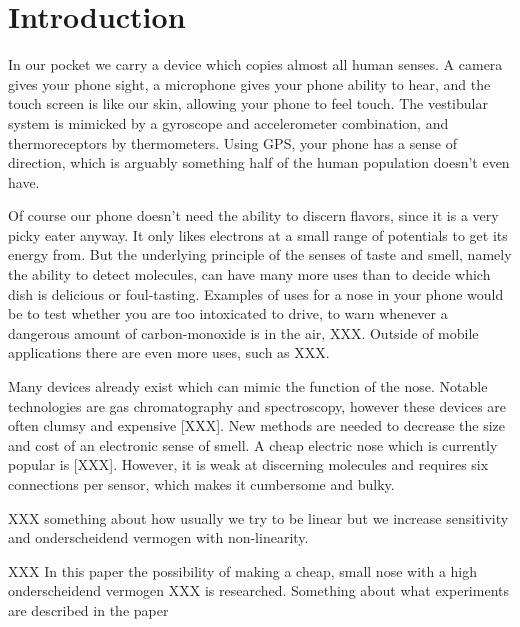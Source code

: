\section{Introduction}
In our pocket we carry a device which copies almost all human senses. A camera gives your phone sight, a microphone gives your phone ability to hear, and the touch screen is like our skin, allowing your phone to feel touch. The vestibular system is mimicked by a gyroscope and accelerometer combination, and thermoreceptors by thermometers. Using GPS, your phone has a sense of direction, which is arguably something half of the human population doesn't even have. 

Of course our phone doesn't need the ability to discern flavors, since it is a very picky eater anyway. It only likes electrons at a small range of potentials to get its energy from. But the underlying principle of the senses of taste and smell, namely the ability to detect molecules, can have many more uses than to decide which dish is delicious or foul-tasting. Examples of uses for a nose in your phone would be to test whether you are too intoxicated to drive, to warn whenever a dangerous amount of carbon-monoxide is in the air, XXX. Outside of mobile applications there are even more uses, such as XXX.

Many devices already exist which can mimic the function of the nose. Notable technologies are gas chromatography and spectroscopy, however these devices are often clumsy and expensive [XXX]. New methods are needed to decrease the size and cost of an electronic sense of smell. A cheap electric nose which is currently popular is [XXX]. However, it is weak at discerning molecules and requires six connections per sensor, which makes it cumbersome and bulky. 

XXX something about how usually we try to be linear but we increase sensitivity and onderscheidend vermogen with non-linearity.

XXX In this paper the possibility of making a cheap, small nose with a high onderscheidend vermogen XXX is researched. Something about what experiments are described in the paper